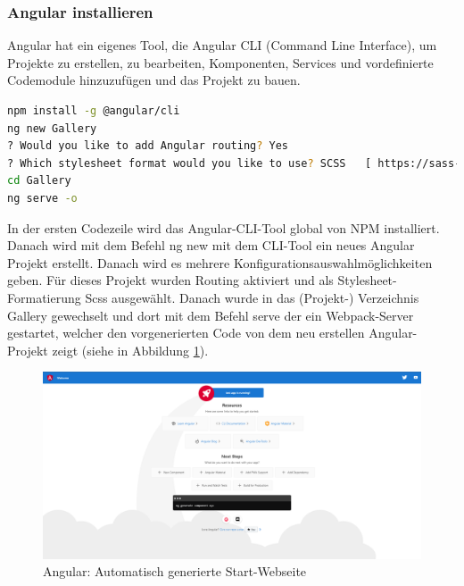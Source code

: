 \subsubsection{Angular installieren}
Angular hat ein eigenes Tool, die Angular CLI (Command Line Interface), um Projekte zu erstellen, zu bearbeiten, Komponenten, Services und vordefinierte Codemodule hinzuzufügen und das Projekt zu bauen.

\begin{lstlisting}[caption={{Terminalm - Angular aufsetzen, Installation der CLI, Configuration eines neuen Projektes, Starten des Projektes}},language=bash]
npm install -g @angular/cli 
ng new Gallery
? Would you like to add Angular routing? Yes
? Which stylesheet format would you like to use? SCSS   [ https://sass-lang.com/documentation/syntax#scss ]
cd Gallery
ng serve -o
\end{lstlisting}

In der ersten Codezeile wird das Angular-CLI-Tool global von NPM installiert.
Danach wird mit dem Befehl ng new mit dem CLI-Tool ein neues Angular Projekt erstellt. Danach wird es mehrere Konfigurationsauswahlmöglichkeiten geben. Für dieses Projekt wurden Routing aktiviert und  als Stylesheet-Formatierung Scss ausgewählt. Danach wurde in das (Projekt-) Verzeichnis Gallery gewechselt und dort mit dem Befehl serve der ein Webpack-Server gestartet, welcher den vorgenerierten Code von dem neu erstellen Angular-Projekt zeigt (siehe in Abbildung \ref{fig:impl:angular-starting-page}). 

\begin{figure}[h t]
    \centering
    \includegraphics[scale=0.25]{pics/AngularStartingPage.png}
    \caption{Angular: Automatisch generierte Start-Webseite}
    \label{fig:impl:angular-starting-page}
\end{figure}

